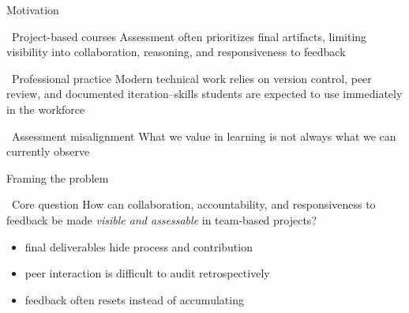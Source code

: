 \documentclass[
    NAME={Dr. Helga Ingimundardóttir},
    EMAIL={helgaingim@hi.is},
    FACULTY={Industrial Engineering},
    TITLE={Using Pull Requests to Make Collaboration Visible in CDIO Project-Based Courses},
    SEMINAR={22\textsuperscript{nd} International CDIO Conference},
    DATE={June 22\textsuperscript{nd} 2026},
    WIDE=true
]{HI-LaTeX/hi-beamer}
\begin{document}
\begin{frame}{Motivation}
\begin{block}{\faBuildingColumns~Project-based courses}
Assessment often prioritizes final artifacts, limiting visibility into collaboration, reasoning, and responsiveness to feedback
\end{block}

\begin{block}{\faGithub~Professional practice}
Modern technical work relies on version control, peer review, and documented iteration--skills students are expected to use immediately in the workforce
\end{block}

\begin{alertblock}{\faScaleBalanced~Assessment misalignment}
What we value in learning is not always what we can currently observe
\end{alertblock}
\end{frame}
\begin{frame}{Framing the problem}
\begin{exampleblock}{\faDumbbell~Core question}
How can collaboration, accountability, and responsiveness to feedback be made \emph{visible and assessable} in team-based projects?
\end{exampleblock}
\begin{itemize}
    \item final deliverables hide process and contribution
    \item peer interaction is difficult to audit retrospectively
    \item feedback often resets instead of accumulating
\end{itemize}
\end{frame}
\end{document}
